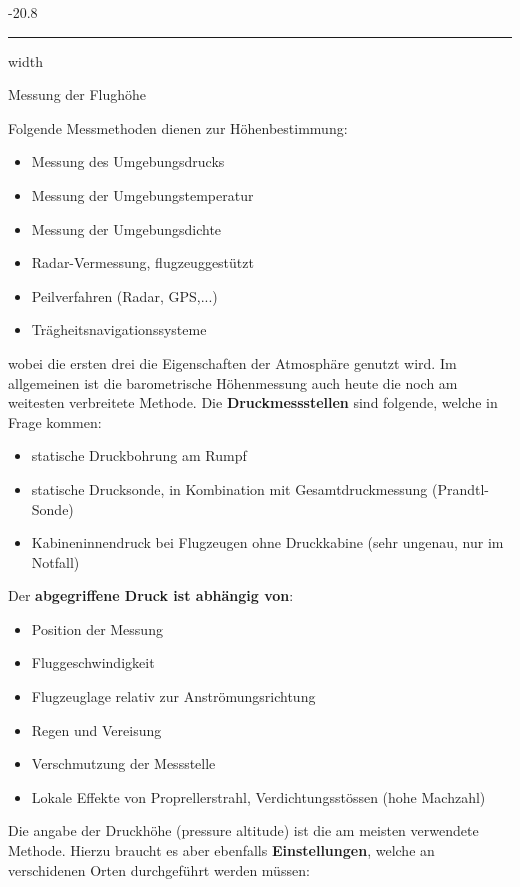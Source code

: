 \documentclass[8pt, landscape, fleqn]{scrartcl}
\makeatletter
\renewcommand{\subsubsection}{\@startsection{subsubsection}{1}{0mm}%
{-2\baselineskip}{0.8\baselineskip}%
{\hrule depth 0.2pt width\columnwidth\vspace*{1.2em}\normalsize\bfseries\rmfamily}}
\makeatother
\begin{document}
\begin{multicols*}{3}
\subsubsection{Messung der Flughöhe}

Folgende Messmethoden dienen zur Höhenbestimmung:

\begin{itemize}
    \item Messung des Umgebungsdrucks
    \item Messung der Umgebungstemperatur
    \item Messung der Umgebungsdichte
    \item Radar-Vermessung, flugzeuggestützt
    \item Peilverfahren (Radar, GPS,...)
    \item Trägheitsnavigationssysteme
\end{itemize}

wobei die ersten drei die Eigenschaften der Atmosphäre genutzt wird. Im allgemeinen ist die barometrische Höhenmessung auch heute die noch am weitesten verbreitete Methode. Die \textbf{Druckmessstellen} sind folgende, welche in Frage kommen:

\begin{itemize}
    \item statische Druckbohrung am Rumpf
    \item statische Drucksonde, in Kombination mit Gesamtdruckmessung (Prandtl-Sonde)
    \item Kabineninnendruck bei Flugzeugen ohne Druckkabine (sehr ungenau, nur im Notfall)
\end{itemize}

Der \textbf{abgegriffene Druck ist abhängig von}:

\begin{itemize}
    \item Position der Messung
    \item Fluggeschwindigkeit
    \item Flugzeuglage relativ zur Anströmungsrichtung
    \item Regen und Vereisung
    \item Verschmutzung der Messstelle
    \item Lokale Effekte von Proprellerstrahl, Verdichtungsstössen (hohe Machzahl)
\end{itemize}

Die angabe der Druckhöhe (pressure altitude) ist die am meisten verwendete Methode. Hierzu braucht es aber ebenfalls \textbf{Einstellungen}, welche an verschidenen Orten durchgeführt werden müssen:


\end{multicols*}
\end{document}
